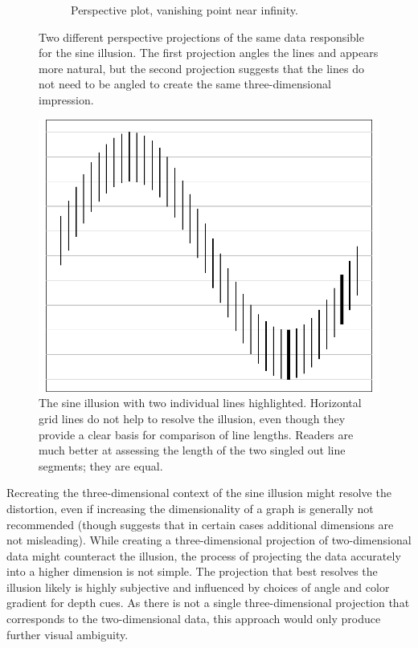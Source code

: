 \documentclass[11pt]{isuthesis}\usepackage[]{graphicx}\usepackage[]{color}
\begin{document}
\begin{figure}[h!tbp]
\begin{subfigure}[t]{.49\textwidth}
\caption{Perspective plot, vanishing point near infinity.\label{ribbon2}}
\end{subfigure}
\caption[Three-dimensional origins of the sine illusion]{Two different perspective projections of the same data responsible for the sine illusion. The first projection angles the lines and appears more natural, but the second projection suggests that the lines do not need to be angled to create the same three-dimensional impression.\label{ribbon}}
\end{figure}





\begin{figure}
\centering
\includegraphics[width=.4\textwidth]{fig-originalgrid}
\caption[Contextual origins of the sine illusion]{\label{fig:original-grid} The sine illusion with two individual lines highlighted. Horizontal grid lines do not help  to resolve the illusion, even though they provide a clear basis for comparison of line lengths. Readers are much better at assessing the length of the two singled out line segments; they are equal.}
\end{figure}

Recreating the three-dimensional context of the sine illusion might resolve the distortion, even if increasing the dimensionality of a graph is generally not recommended \citep{tufte, cleveland:1984} (though \citet{spence:1990} suggests that in certain cases additional dimensions are not misleading). While creating a three-dimensional projection of two-dimensional data might counteract the illusion, the process of projecting the data accurately into a higher dimension is not simple. The projection that best resolves the illusion likely is highly subjective and influenced by choices of angle and color gradient for depth cues. As there is not a single three-dimensional projection that corresponds to the two-dimensional data, this approach would only produce further visual ambiguity.
\end{document}

